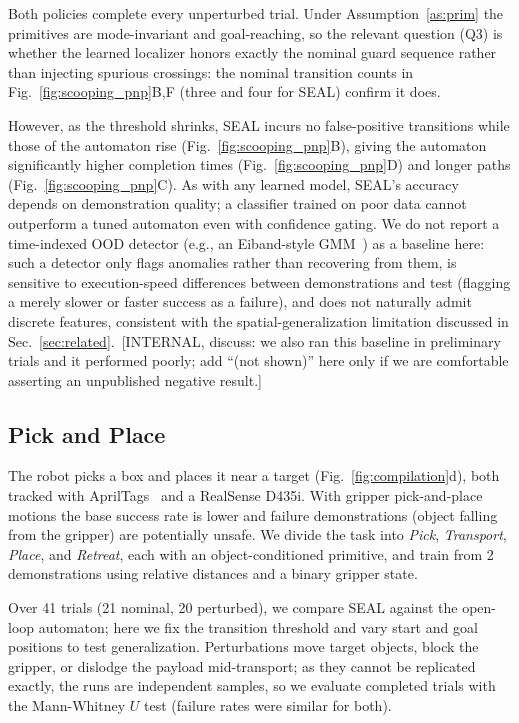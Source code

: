  Both policies complete every unperturbed trial. Under Assumption~\ref{as:prim} the primitives are mode-invariant and goal-reaching, so the relevant question (Q3) is whether the learned localizer honors exactly the nominal guard sequence rather than injecting spurious crossings: the nominal transition counts in Fig.~\ref{fig:scooping_pnp}B,F (three and four for SEAL) confirm it does.
 
 
 However, as the threshold shrinks, SEAL incurs no false-positive transitions while those of the automaton rise (Fig.~\ref{fig:scooping_pnp}B), giving the automaton significantly higher completion times (Fig.~\ref{fig:scooping_pnp}D) and longer paths (Fig.~\ref{fig:scooping_pnp}C). As with any learned model, SEAL's accuracy depends on demonstration quality; a classifier trained on poor data cannot outperform a tuned automaton even with confidence gating. We do not report a time-indexed OOD detector (e.g., an Eiband-style GMM~\cite{eiband_intuitive_2019}) as a baseline here: such a detector only flags anomalies rather than recovering from them, is sensitive to execution-speed differences between demonstrations and test (flagging a merely slower or faster success as a failure), and does not naturally admit discrete features, consistent with the spatial-generalization limitation discussed in Sec.~\ref{sec:related}.{\color{blue}\ [INTERNAL, discuss: we also ran this baseline in preliminary trials and it performed poorly; add ``(not shown)'' here only if we are comfortable asserting an unpublished negative result.]}

\subsection{Pick and Place}
The robot picks a box and places it near a target (Fig.~\ref{fig:compilation}d), both tracked with AprilTags~\cite{7759617} and a RealSense D435i. With gripper pick-and-place motions the base success rate is lower and failure demonstrations (object falling from the gripper) are potentially unsafe. We divide the task into \textit{Pick}, \textit{Transport}, \textit{Place}, and \textit{Retreat}, each with an object-conditioned primitive, and train from 2 demonstrations using relative distances and a binary gripper state.

Over 41 trials (21 nominal, 20 perturbed), we compare SEAL against the open-loop automaton; here we fix the transition threshold and vary start and goal positions to test generalization. Perturbations move target objects, block the gripper, or dislodge the payload mid-transport; as they cannot be replicated exactly, the runs are independent samples, so we evaluate completed trials with the Mann-Whitney $U$ test (failure rates were similar for both).

